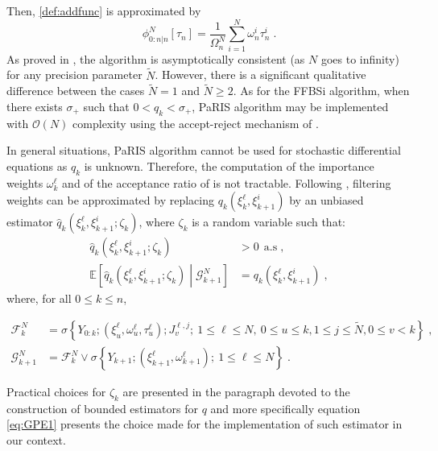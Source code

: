 \documentclass[12pt]{article}
\newcommand{\eqsp}{\;}
\newcommand{\1}{\mathrm{1}}
\newcommand{\qk}{q_{k}}
\begin{document}
Then, \eqref{def:addfunc} is approximated by
\[
\phi_{0:n\vert n}^N[\tau_n] = \frac{1}{\Omega_n^N}\sum_{i=1}^N \omega^{i}_n \tau_n^i\eqsp.
\] 
As proved in \cite{olsson:westerborn:2016}, the algorithm is asymptotically consistent (as $N$ goes to infinity) for any precision parameter $\tilde N$. However, there is a significant qualitative difference between the cases $\tilde{N} = 1$ and $\tilde{N} \geq 2$. As for the FFBSi algorithm,  when there exists $\sigma_+$ such that $0<\qk <\sigma_+$, PaRIS algorithm may be implemented with $\mathcal{O}(N)$ complexity using the accept-reject mechanism of \cite{douc:garivier:moulines:olsson:2011}.

In general situations, PaRIS algorithm cannot be used for stochastic differential equations as $\qk$ is unknown. Therefore, the computation of the importance weights $\omega_{k}^{\ell}$ and of the acceptance ratio of \cite{douc:garivier:moulines:olsson:2011} is not tractable. Following \cite{fearnhead:papaspiliopoulos:roberts:2008,olsson:strojby:2011}, filtering weights can be approximated by replacing $\qk(\xi^{\ell}_{k},\xi_{k+1}^{i})$  by an unbiased  estimator $\widehat{q}_k(\xi^{\ell}_{k},\xi_{k+1}^{i};\zeta_k)$, where $\zeta_k$ is a random variable such that:
\begin{align*}
\widehat{q}_k(\xi^{\ell}_{k},\xi_{k+1}^{i};\zeta_k)&> 0~~\text{a.s}\eqsp,\\
\mathbb{E}\left[\widehat{q}_k(\xi^{\ell}_{k},\xi_{k+1}^{i};\zeta_k)\middle| \mathcal{G}_{k+1}^N\right] &= \qk(\xi^{\ell}_{k},\xi_{k+1}^{i})\eqsp,
\end{align*}
where, for all $0\le k \le n$, 


\begin{align*}
\mathcal{F}_{k}^N &= \sigma\left\{Y_{0:k};(\xi^{\ell}_{u},\omega^{\ell}_{u},\tau^{\ell}_{u});J_{v}^{\ell,j};~1\le \ell\le N,~0\le u\le k, 1\le j \le \widetilde{N}, 0\le v< k\right\}\eqsp,\\
\mathcal{G}_{k+1}^N &= \mathcal{F}_{k}^N \vee \sigma\left\{Y_{k+1};(\xi^{\ell}_{k+1},\omega^{\ell}_{k+1});~1\le \ell\le N\right\}\eqsp.
\end{align*}

Practical choices for $\zeta_k$ are presented in the paragraph devoted to the construction of bounded estimators for $q$ and more specifically equation \ref{eq:GPE1} presents the choice made for the implementation of such estimator in our context.
\end{document}
